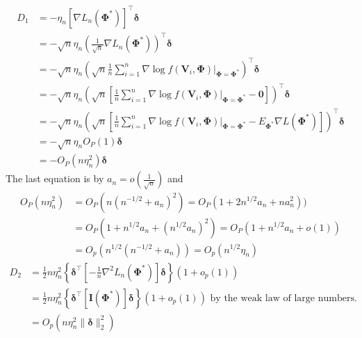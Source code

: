 \documentclass[a4paper,fleqn]{cas-sc}
\newcommand{\Op}{O_{P}}
\newcommand{\bdelta}{\boldsymbol{\delta}}
\begin{document}
{\begin{align}
	D_{1} & =-\eta_{n}\left[\nabla L_{n}\left(\boldsymbol{\Phi}^{*}\right)\right]^{\top}\boldsymbol{\delta}\nonumber \\
	& =-\sqrt{n}\eta_{n}\left(\frac{1}{\sqrt{n}}\nabla L_{n}\left(\boldsymbol{\Phi}^{*}\right)\right)^{\top}\boldsymbol{\delta}\nonumber \\
	& =-\sqrt{n}\eta_{n}\left(\sqrt{n}\frac{1}{n}\sum_{i=1}^{n}\nabla\log f\left.\left(\boldsymbol{V}_{i},\boldsymbol{\Phi}\right)\right|_{\boldsymbol{\Phi}=\boldsymbol{\Phi}^{*}}\right)^{\top}\boldsymbol{\delta}\nonumber \\
	& =-\sqrt{n}\eta_{n}\left(\sqrt{n}\left[\frac{1}{n}\sum_{i=1}^{n}\nabla\log f\left.\left(\boldsymbol{V}_{i},\boldsymbol{\Phi}\right)\right|_{\boldsymbol{\Phi}=\boldsymbol{\Phi}^{*}}-\mathbf{0}\right]\right)^{\top}\boldsymbol{\delta}\nonumber \\
	& =-\sqrt{n}\eta_{n}\left(\sqrt{n}\left[\frac{1}{n}\sum_{i=1}^{n}\nabla\log f\left.\left(\boldsymbol{V}_{i},\boldsymbol{\Phi}\right)\right|_{\boldsymbol{\Phi}=\boldsymbol{\Phi}^{*}}-E_{\boldsymbol{\Phi}^{*}}\nabla L\left(\boldsymbol{\Phi}^{*}\right)\right]\right)^{\top}\boldsymbol{\delta}\nonumber \\
	& =-\sqrt{n}\eta_{n}\Op\left(1\right)\boldsymbol{\delta}\nonumber \\
	& =-\Op\left(n\eta_{n}^{2}\right)\boldsymbol{\delta}\label{eq:lemma1A1}
	\end{align}
	The last equation is by $a_{n}=o(\frac{1}{\sqrt{n}})$ and
	\begin{align*}
	\Op(n\eta_{n}^{2}) & =\Op(n(n^{-1/2}+a_{n})^{2})=\Op(1+2n^{1/2}a_{n}+na_{n}^{2}))\\
	& =\Op(1+n^{1/2}a_{n}+(n^{1/2}a_{n})^{2})=\Op(1+n^{1/2}a_{n}+o(1))\\
	& =O_{p}(n^{1/2}(n^{-1/2}+a_{n}))=O_{p}(n^{1/2}\eta_{n})
	\end{align*}
	\begin{align}
	D_{2} & =\frac{1}{2}n\eta_{n}^{2}\left\{ \boldsymbol{\delta}^{\top}\left[-\frac{1}{n}\nabla^{2}L_{n}\left(\boldsymbol{\Phi}^{*}\right)\right]\boldsymbol{\delta}\right\} \left(1+o_{p}(1)\right)\nonumber \\
	& =\frac{1}{2}n\eta_{n}^{2}\left\{ \boldsymbol{\delta}^{\top}\left[\mathbf{I}\left(\boldsymbol{\Phi}^{*}\right)\right]\boldsymbol{\delta}\right\} \left(1+o_{p}(1)\right)\text{ by the weak law of large numbers. }\nonumber \\
	& =O_{p}(n\eta_{n}^{2}\|\bdelta\|_{2}^{2})\label{eq:lemma1A2}
	\end{align}
}
\end{document}

